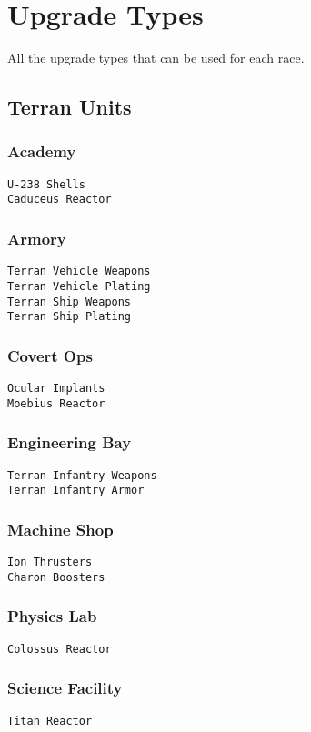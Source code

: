 \chapter{Upgrade Types}
\label{upgradetype}
All the upgrade types that can be used for each race.

\section{Terran Units}

\subsection{Academy}
\verb|U-238 Shells| \\
\verb|Caduceus Reactor|

\subsection{Armory}
\verb|Terran Vehicle Weapons|\\
\verb|Terran Vehicle Plating|\\
\verb|Terran Ship Weapons|\\
\verb|Terran Ship Plating|

\subsection{Covert Ops}
\verb|Ocular Implants|\\
\verb|Moebius Reactor|

\subsection{Engineering Bay}
\verb|Terran Infantry Weapons|\\
\verb|Terran Infantry Armor|

\subsection{Machine Shop}
\verb|Ion Thrusters|\\
\verb|Charon Boosters|

\subsection{Physics Lab}
\verb|Colossus Reactor|

\subsection{Science Facility}
\verb|Titan Reactor|

